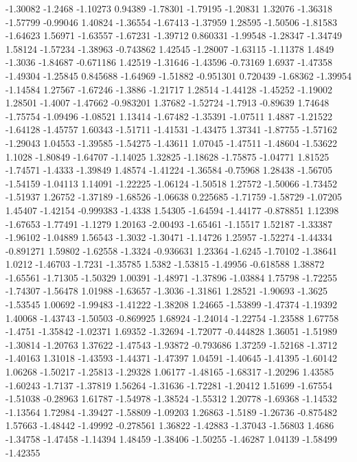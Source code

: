\documentclass[9pt]{article}
\theoremstyle{plain}
\theoremstyle{definition}
\theoremstyle{remark}
\numberwithin{equation}{section}
\begin{document}
-1.30082
-1.2468
-1.10273
0.94389
-1.78301
-1.79195
-1.20831
1.32076
-1.36318
-1.57799
-0.99046
1.40824
-1.36554
-1.67413
-1.37959
1.28595
-1.50506
-1.81583
-1.64623
1.56971
-1.63557
-1.67231
-1.39712
0.860331
-1.99548
-1.28347
-1.34749
1.58124
-1.57234
-1.38963
-0.743862
1.42545
-1.28007
-1.63115
-1.11378
1.4849
-1.3036
-1.84687
-0.671186
1.42519
-1.31646
-1.43596
-0.73169
1.6937
-1.47358
-1.49304
-1.25845
0.845688
-1.64969
-1.51882
-0.951301
0.720439
-1.68362
-1.39954
-1.14584
1.27567
-1.67246
-1.3886
-1.21717
1.28514
-1.44128
-1.45252
-1.19002
1.28501
-1.4007
-1.47662
-0.983201
1.37682
-1.52724
-1.7913
-0.89639
1.74648
-1.75754
-1.09496
-1.08521
1.13414
-1.67482
-1.35391
-1.07511
1.4887
-1.21522
-1.64128
-1.45757
1.60343
-1.51711
-1.41531
-1.43475
1.37341
-1.87755
-1.57162
-1.29043
1.04553
-1.39585
-1.54275
-1.43611
1.07045
-1.47511
-1.48604
-1.53622
1.1028
-1.80849
-1.64707
-1.14025
1.32825
-1.18628
-1.75875
-1.04771
1.81525
-1.74571
-1.4333
-1.39849
1.48574
-1.41224
-1.36584
-0.75968
1.28438
-1.56705
-1.54159
-1.04113
1.14091
-1.22225
-1.06124
-1.50518
1.27572
-1.50066
-1.73452
-1.51937
1.26752
-1.37189
-1.68526
-1.06638
0.225685
-1.71759
-1.58729
-1.07205
1.45407
-1.42154
-0.999383
-1.4338
1.54305
-1.64594
-1.44177
-0.878851
1.12398
-1.67653
-1.77491
-1.1279
1.20163
-2.00493
-1.65461
-1.15517
1.52187
-1.33387
-1.96102
-1.04889
1.56543
-1.3032
-1.30471
-1.14726
1.25957
-1.52274
-1.44334
-0.891271
1.59802
-1.62558
-1.3324
-0.936631
1.23364
-1.6245
-1.70102
-1.38641
1.0212
-1.46703
-1.7231
-1.35785
1.5382
-1.53815
-1.49956
-0.618588
1.38872
-1.65561
-1.71305
-1.50329
1.00391
-1.48971
-1.37896
-1.03884
1.75798
-1.72255
-1.74307
-1.56478
1.01988
-1.63657
-1.3036
-1.31861
1.28521
-1.90693
-1.3625
-1.53545
1.00692
-1.99483
-1.41222
-1.38208
1.24665
-1.53899
-1.47374
-1.19392
1.40068
-1.43743
-1.50503
-0.869925
1.68924
-1.24014
-1.22754
-1.23588
1.67758
-1.4751
-1.35842
-1.02371
1.69352
-1.32694
-1.72077
-0.444828
1.36051
-1.51989
-1.30814
-1.20763
1.37622
-1.47543
-1.93872
-0.793686
1.37259
-1.52168
-1.3712
-1.40163
1.31018
-1.43593
-1.44371
-1.47397
1.04591
-1.40645
-1.41395
-1.60142
1.06268
-1.50217
-1.25813
-1.29328
1.06177
-1.48165
-1.68317
-1.20296
1.43585
-1.60243
-1.7137
-1.37819
1.56264
-1.31636
-1.72281
-1.20412
1.51699
-1.67554
-1.51038
-0.28963
1.61787
-1.54978
-1.38524
-1.55312
1.20778
-1.69368
-1.14532
-1.13564
1.72984
-1.39427
-1.58809
-1.09203
1.26863
-1.5189
-1.26736
-0.875482
1.57663
-1.48442
-1.49992
-0.278561
1.36822
-1.42883
-1.37043
-1.56803
1.4686
-1.34758
-1.47458
-1.14394
1.48459
-1.38406
-1.50255
-1.46287
1.04139
-1.58499
-1.42355
\end{document}
